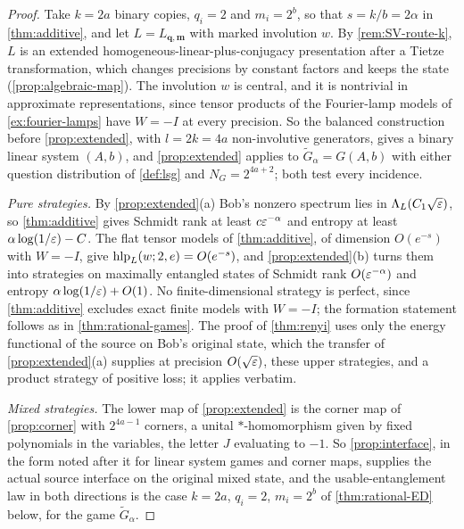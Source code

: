 \begin{proof}
Take $k=2a$ binary copies, $q_i=2$ and $m_i=2^b$, so that $s=k/b=2\alpha$ in \cref{thm:additive}, and let $L=L_{\mathbf q,\mathbf m}$ with
marked involution $w$. By \cref{rem:SV-route-k}, $L$ is an extended homogeneous-linear-plus-conjugacy presentation after a
Tietze transformation, which changes precisions by constant factors and keeps the state (\cref{prop:algebraic-map}). The
involution $w$ is central, and it is nontrivial in approximate representations, since tensor products of the Fourier-lamp
models of \cref{ex:fourier-lamps} have $W=-I$ at every precision. So the balanced construction before \cref{prop:extended}, with
$l=2k=4a$ non-involutive generators, gives a binary linear system $(A,b)$, and \cref{prop:extended} applies to $\widetilde G_\alpha=G(A,b)$
with either question distribution of \cref{def:lsg} and $N_G=2^{4a+2}$; both test every incidence.

\emph{Pure strategies.} By \cref{prop:extended}(a) Bob's nonzero spectrum lies in $\Lambda_L(C_1\sqrt{\varepsilon})$, so \cref{thm:additive} gives
Schmidt rank at least $c\varepsilon^{-\alpha}$ and entropy at least $\alpha\log(1/\varepsilon)-C$. The flat tensor models of \cref{thm:additive}, of
dimension $O(e^{-s})$ with $W=-I$, give $\operatorname{hlp}_L(w;2,e)=O(e^{-s})$, and \cref{prop:extended}(b) turns them into strategies on maximally
entangled states of Schmidt rank $O(\varepsilon^{-\alpha})$ and entropy $\alpha\log(1/\varepsilon)+O(1)$. No finite-dimensional strategy is perfect,
since \cref{thm:additive} excludes exact finite models with $W=-I$; the formation statement follows as in \cref{thm:rational-games}.
The proof of \cref{thm:renyi} uses only the energy functional of the source on Bob's original state, which the transfer of
\cref{prop:extended}(a) supplies at precision $O(\sqrt{\varepsilon})$, these upper strategies, and a product strategy of positive loss; it
applies verbatim.

\emph{Mixed strategies.} The lower map of \cref{prop:extended} is the corner map of \cref{prop:corner} with $2^{4a-1}$ corners, a
unital $*$-homomorphism given by fixed polynomials in the variables, the letter $J$ evaluating to $-1$. So \cref{prop:interface}, in the
form noted after it for linear system games and corner maps, supplies the actual source interface on the original mixed state,
and the usable-entanglement law in both directions is the case $k=2a$, $q_i=2$, $m_i=2^b$ of \cref{thm:rational-ED} below, for the
game $\widetilde G_\alpha$.
\end{proof}

